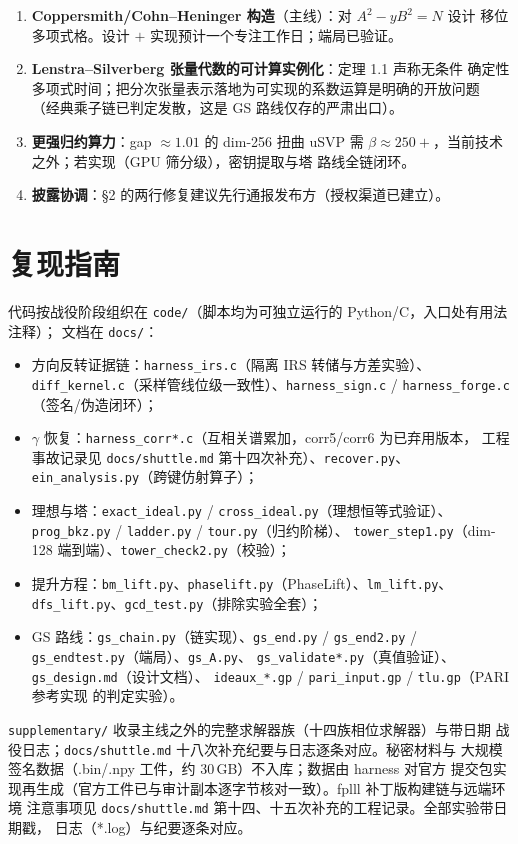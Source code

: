 \documentclass[UTF8,11pt,a4paper]{ctexart}
\newcommand{\code}[1]{\texttt{\small #1}}
\begin{document}
\begin{enumerate}
\item \textbf{Coppersmith/Cohn--Heninger 构造}（主线）：对 $A^2 - yB^2 = N$ 设计
  移位多项式格。设计 $+$ 实现预计一个专注工作日；端局已验证。
\item \textbf{Lenstra--Silverberg 张量代数的可计算实例化}：定理 1.1 声称无条件
  确定性多项式时间；把分次张量表示落地为可实现的系数运算是明确的开放问题
  （经典乘子链已判定发散，这是 GS 路线仅存的严肃出口）。
\item \textbf{更强归约算力}：gap $\approx 1.01$ 的 dim-256 扭曲 uSVP 需
  $\beta \approx 250{+}$，当前技术之外；若实现（GPU 筛分级），密钥提取与塔
  路线全链闭环。
\item \textbf{披露协调}：\S2 的两行修复建议先行通报发布方（授权渠道已建立）。
\end{enumerate}

\section{复现指南}

代码按战役阶段组织在 \code{code/}（脚本均为可独立运行的 Python/C，入口处有用法注释）；
文档在 \code{docs/}：
\begin{itemize}
\item 方向反转证据链：\code{harness\_irs.c}（隔离 IRS 转储与方差实验）、
  \code{diff\_kernel.c}（采样管线位级一致性）、\code{harness\_sign.c} /
  \code{harness\_forge.c}（签名/伪造闭环）；
\item $\gamma$ 恢复：\code{harness\_corr*.c}（互相关谱累加，corr5/corr6 为已弃用版本，
  工程事故记录见 \code{docs/shuttle.md} 第十四次补充）、\code{recover.py}、
  \code{ein\_analysis.py}（跨键仿射算子）；
\item 理想与塔：\code{exact\_ideal.py} / \code{cross\_ideal.py}（理想恒等式验证）、
  \code{prog\_bkz.py} / \code{ladder.py} / \code{tour.py}（归约阶梯）、
  \code{tower\_step1.py}（dim-128 端到端）、\code{tower\_check2.py}（校验）；
\item 提升方程：\code{bm\_lift.py}、\code{phaselift.py}（PhaseLift）、\code{lm\_lift.py}、
  \code{dfs\_lift.py}、\code{gcd\_test.py}（排除实验全套）；
\item GS 路线：\code{gs\_chain.py}（链实现）、\code{gs\_end.py} /
  \code{gs\_end2.py} / \code{gs\_endtest.py}（端局）、\code{gs\_A.py}、
  \code{gs\_validate*.py}（真值验证）、\code{gs\_design.md}（设计文档）、
  \code{ideaux\_*.gp} / \code{pari\_input.gp} / \code{tlu.gp}（PARI 参考实现
  的判定实验）。
\end{itemize}
\code{supplementary/} 收录主线之外的完整求解器族（十四族相位求解器）与带日期
战役日志；\code{docs/shuttle.md} 十八次补充纪要与日志逐条对应。秘密材料与
大规模签名数据（.bin/.npy 工件，约 30\,GB）不入库；数据由 harness 对官方
提交包实现再生成（官方工件已与审计副本逐字节核对一致）。fplll 补丁版构建链与远端环境
注意事项见 \code{docs/shuttle.md} 第十四、十五次补充的工程记录。全部实验带日期戳，
日志（*.log）与纪要逐条对应。
\end{document}
